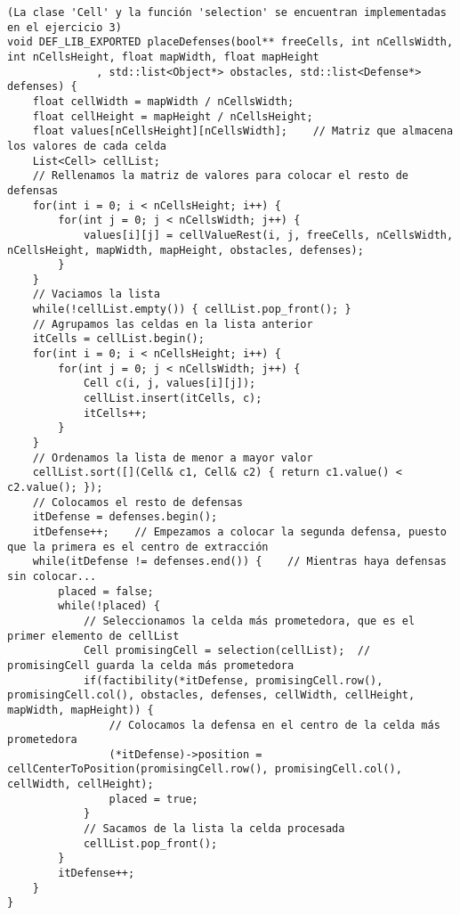 \begin{lstlisting}
(La clase 'Cell' y la función 'selection' se encuentran implementadas en el ejercicio 3)
void DEF_LIB_EXPORTED placeDefenses(bool** freeCells, int nCellsWidth, int nCellsHeight, float mapWidth, float mapHeight
              , std::list<Object*> obstacles, std::list<Defense*> defenses) {
    float cellWidth = mapWidth / nCellsWidth;
    float cellHeight = mapHeight / nCellsHeight; 
    float values[nCellsHeight][nCellsWidth];    // Matriz que almacena los valores de cada celda
    List<Cell> cellList;
    // Rellenamos la matriz de valores para colocar el resto de defensas
    for(int i = 0; i < nCellsHeight; i++) {
        for(int j = 0; j < nCellsWidth; j++) {
            values[i][j] = cellValueRest(i, j, freeCells, nCellsWidth, nCellsHeight, mapWidth, mapHeight, obstacles, defenses);
        }
    }
    // Vaciamos la lista
    while(!cellList.empty()) { cellList.pop_front(); }
    // Agrupamos las celdas en la lista anterior
    itCells = cellList.begin();
    for(int i = 0; i < nCellsHeight; i++) {
        for(int j = 0; j < nCellsWidth; j++) {
            Cell c(i, j, values[i][j]);
            cellList.insert(itCells, c);
            itCells++;
        }
    }
    // Ordenamos la lista de menor a mayor valor
    cellList.sort([](Cell& c1, Cell& c2) { return c1.value() < c2.value(); });
    // Colocamos el resto de defensas
    itDefense = defenses.begin();
    itDefense++;    // Empezamos a colocar la segunda defensa, puesto que la primera es el centro de extracción
    while(itDefense != defenses.end()) {    // Mientras haya defensas sin colocar...
        placed = false;
        while(!placed) {
            // Seleccionamos la celda más prometedora, que es el primer elemento de cellList
            Cell promisingCell = selection(cellList);  // promisingCell guarda la celda más prometedora
            if(factibility(*itDefense, promisingCell.row(), promisingCell.col(), obstacles, defenses, cellWidth, cellHeight, mapWidth, mapHeight)) {
                // Colocamos la defensa en el centro de la celda más prometedora
                (*itDefense)->position = cellCenterToPosition(promisingCell.row(), promisingCell.col(), cellWidth, cellHeight);
                placed = true;
            }
            // Sacamos de la lista la celda procesada
            cellList.pop_front();
        }
        itDefense++;
    }
}
\end{lstlisting}